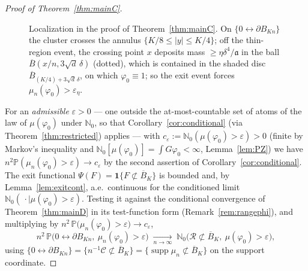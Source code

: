 \documentclass[11pt]{article}
\theoremstyle{definition}
\theoremstyle{remark}
\newcommand{\bP}{\mathbb{P}}
\newcommand{\bN}{{\mathbb{N}_0}}                 %
\newcommand{\supp}{\operatorname{supp}}
\newcommand{\Ran}{\mathcal{R}}                 %
\newcommand{\eps}{\varepsilon}
\numberwithin{equation}{section}
\theoremstyle{plain}
\theoremstyle{definition}
\theoremstyle{remark}
\theoremstyle{plain}
\begin{document}
\begin{proof}[Proof of Theorem~\ref{thm:mainC}]
\begin{figure}[htb]
\centering
%
\caption{Localization in the proof of Theorem~\ref{thm:mainC}. On
$\{0\leftrightarrow\partial B_{Kn}\}$ the cluster crosses the annulus
$\{K/8\le|y|\le K/4\}$; off the thin-region event, the crossing point $x$
deposits mass $\ge\eta\delta^4/\mathfrak a$ in the ball
$\overline B(x/n,3\sqrt d\,\delta)$ (dotted), which is contained in the shaded disc
$\overline B_{(K/4)+3\sqrt d\,\delta}$, on which $\varphi_0\equiv1$; so the exit event
forces $\mu_n(\varphi_0)>\eps_\eta$.}
\label{fig:onearmloc}
\end{figure} For an \emph{admissible} $\eps>0$ --- one
outside the at-most-countable set of atoms of the law of $\mu(\varphi_0)$ under
$\bN$, so that Corollary~\ref{cor:conditional} (via
Theorem~\ref{thm:restricted}) applies --- with $c_\eps:=\bN(\mu(\varphi_0)>\eps)>0$ (finite by Markov's
inequality and $\bN[\mu(\varphi_0)]=\int G\varphi_0<\infty$,
Lemma~\ref{lem:PZ})
we have $n^2\bP(\mu_n(\varphi_0)>\eps)\to c_\eps$ by the second assertion
of Corollary~\ref{cor:conditional}. The exit functional $\Psi(F)=\mathbf 1\{F\not\subset\overline B_K\}$ is bounded
and, by Lemma~\ref{lem:exitcont}, a.e.\ continuous for the conditioned limit
$\bN(\,\cdot\mid\mu(\varphi_0)>\eps)$. Testing it against the conditional
convergence of Theorem~\ref{thm:mainD} in its test-function form
(Remark~\ref{rem:rangephi}), and multiplying by
$n^2\,\bP\bigl(\mu_n(\varphi_0)>\eps\bigr)\to c_\eps$,
\[
n^2\,\bP\bigl(0\leftrightarrow\partial B_{Kn},\ \mu_n(\varphi_0)>\eps\bigr)
\;\xrightarrow[n\to\infty]{}\;\bN\bigl(\Ran\not\subset\overline B_K,\ \mu(\varphi_0)>\eps\bigr),
\]
using $\{0\leftrightarrow\partial B_{Kn}\}=\{n^{-1}\mathcal C\not\subset
\overline B_K\}=\{\supp\mu_n\not\subset\overline B_K\}$ on the support coordinate.


\end{proof}
\end{document}
